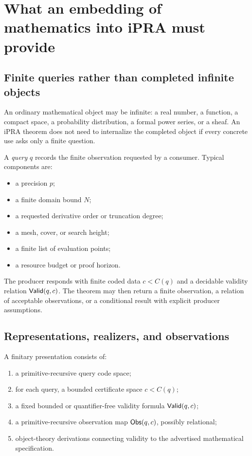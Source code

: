 \section{What an embedding of mathematics into iPRA must provide}

\subsection{Finite queries rather than completed infinite objects}

An ordinary mathematical object may be infinite: a real number, a function, a compact space, a probability distribution, a formal power series, or a sheaf.  An iPRA theorem does not need to internalize the completed object if every concrete use asks only a finite question.

A \emph{query} \(q\) records the finite observation requested by a consumer.  Typical components are:

\begin{itemize}
\item a precision \(p\);
\item a finite domain bound \(N\);
\item a requested derivative order or truncation degree;
\item a mesh, cover, or search height;
\item a finite list of evaluation points;
\item a resource budget or proof horizon.
\end{itemize}

The producer responds with finite coded data \(c<C(q)\) and a decidable validity relation \(\mathsf{Valid}(q,c)\).  The theorem may then return a finite observation, a relation of acceptable observations, or a conditional result with explicit producer assumptions.

\subsection{Representations, realizers, and observations}

\begin{definition}
A finitary presentation consists of:
\begin{enumerate}
\item a primitive-recursive query code space;
\item for each query, a bounded certificate space \(c<C(q)\);
\item a fixed bounded or quantifier-free validity formula \(\mathsf{Valid}(q,c)\);
\item a primitive-recursive observation map \(\mathsf{Obs}(q,c)\), possibly relational;
\item object-theory derivations connecting validity to the advertised mathematical specification.
\end{enumerate}
\end{definition}

